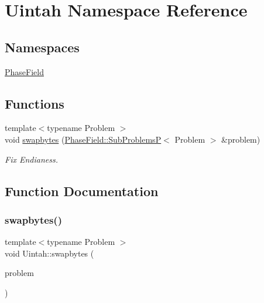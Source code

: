 \hypertarget{namespaceUintah}{}\section{Uintah Namespace Reference}
\label{namespaceUintah}
\subsection*{Namespaces}
\begin{DoxyCompactItemize}
\item 
 \hyperlink{namespaceUintah_1_1PhaseField}{Phase\+Field}
\end{DoxyCompactItemize}
\subsection*{Functions}
\begin{DoxyCompactItemize}
\item 
{\footnotesize template$<$typename Problem $>$ }\\void \hyperlink{namespaceUintah_a605ff3bae9f272e0b9df14f572b35d37}{swapbytes} (\hyperlink{namespaceUintah_1_1PhaseField_acb95bc634a12aa4120b33fbe933f24bd}{Phase\+Field\+::\+Sub\+ProblemsP}$<$ Problem $>$ \&problem)
\begin{DoxyCompactList}\small\item\em Fix Endianess. \end{DoxyCompactList}\end{DoxyCompactItemize}


\subsection{Function Documentation}
\mbox{\label{namespaceUintah_a605ff3bae9f272e0b9df14f572b35d37}} 
\subsubsection{\texorpdfstring{swapbytes()}{swapbytes()}}
{\footnotesize\ttfamily template$<$typename Problem $>$ \\
void Uintah\+::swapbytes (\begin{DoxyParamCaption}\item[{\hyperlink{namespaceUintah_1_1PhaseField_acb95bc634a12aa4120b33fbe933f24bd}{Phase\+Field\+::\+Sub\+ProblemsP}$<$ Problem $>$ \&}]{problem }\end{DoxyParamCaption})\hspace{0.3cm}{\ttfamily [inline]}}




